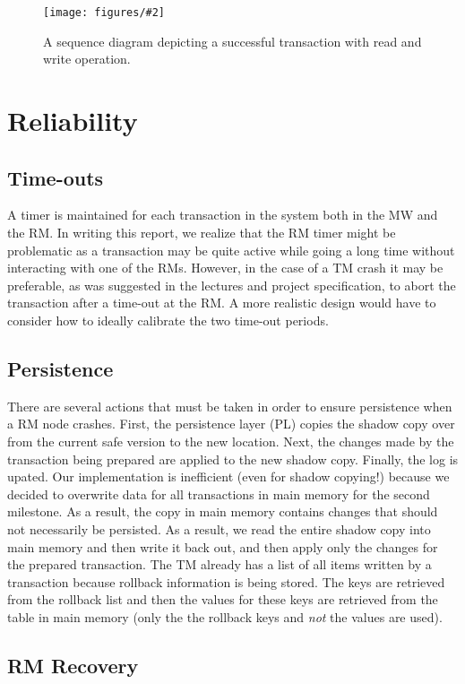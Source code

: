 \documentclass{article}
\newcommand{\addfigure}[4]{

\begin{figure}[h]
	\centering
	\texttt{[image: figures/\#2]}
	\caption{#3}
	\label{#4}
\end{figure}

}
\begin{document}
\addfigure{0.55}{sequence.pdf}{A sequence diagram depicting a successful transaction with read and write operation.}{f:sequence}


\section{Reliability}

\subsection{Time-outs}

A timer is maintained for each transaction in the system both in the MW and the RM. In writing this report, we realize that the RM timer might be problematic as a transaction may be quite active while going a long time without interacting with one of the RMs. However, in the case of a TM crash it may be preferable, as was suggested in the lectures and project specification, to abort the transaction after a time-out at the RM. A more realistic design would have to consider how to ideally calibrate the two time-out periods.

\subsection{Persistence}

There are several actions that must be taken in order to ensure persistence when a RM node crashes. First, the persistence layer (PL) copies the shadow copy over from the current safe version to the new location. Next, the changes made by the transaction being prepared are applied to the new shadow copy. Finally, the log is upated. Our implementation is inefficient (even for shadow copying!) because we decided to overwrite data for all transactions in main memory for the second milestone. As a result, the copy in main memory contains changes that should not necessarily be persisted. As a result, we read the entire shadow copy into main memory and then write it back out, and then apply only the changes for the prepared transaction. The TM already has a list of all items written by a transaction because rollback information is being stored. The keys are retrieved from the rollback list and then the values for these keys are retrieved from the table in main memory (only the the rollback keys and \textit{not} the values are used).

\subsection{RM Recovery}
\end{document}

